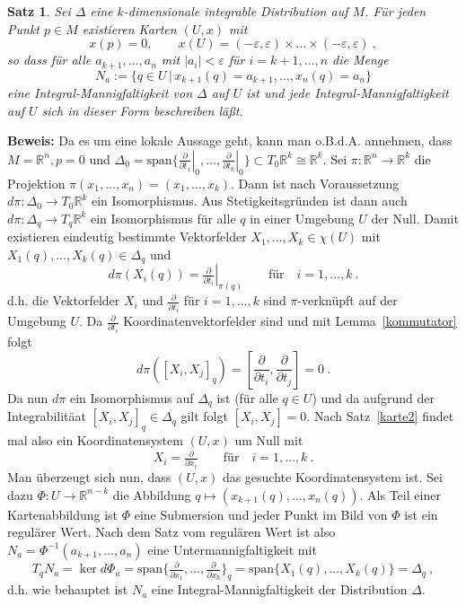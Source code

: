 \documentclass[12pt,a4paper]{article}
\def\R{\mathbb{R}}
\newtheorem{Satz}[Lemma]{Satz}
\def\proof{\noindent\textbf{Beweis:}\quad}
\begin{document}
\begin{Satz}
Sei $\Delta$ eine $k$-dimensionale integrable Distribution auf $M$. F\"ur jeden Punkt $p\in M$ existieren
Karten $(U,x)$ mit
$$
x(p) = 0, \qquad x(U) = (-\varepsilon, \varepsilon) \times \ldots \times  (-\varepsilon, \varepsilon) \ ,
$$
so dass f\"ur alle $a_{k+1}, \ldots, a_n$ mit $|a_i| < \varepsilon$ f\"ur $i=k+1,\ldots, n $ die Menge
$$
N_a := \{q\in U \,|\, x_{k+1}(q)= a_{k+1}, \ldots, x_n(q)=a_n\}
$$
eine Integral-Mannigfaltigkeit von $\Delta$ auf $U$ ist und jede Integral-Mannigfaltigkeit auf $U$ sich in
dieser Form beschreiben l\"a\ss t.
\end{Satz}
\proof
Da es um eine lokale Aussage geht, kann man o.B.d.A. annehmen, dass $M=\R^n, p=0$ und
$\Delta_0 = \mathrm{span} \{ \left.\tfrac{\partial }{\partial t_1}\right|_0, \ldots, \left.\tfrac{\partial }{\partial t_k}\right|_0\}
\subset T_0\R^k \cong \R^k$. Sei $\pi : \R^n \rightarrow \R^k$ die Projektion
$\pi(x_1,\ldots, x_n) = (x_1, \ldots, x_k)$. Dann ist nach Voraussetzung
$d\pi : \Delta_0 \rightarrow T_0\R^k$ ein Isomorphismus. Aus Stetigkeitsgr\"unden ist dann auch
$d\pi : \Delta_q \rightarrow T_q\R^k$ ein Isomorphismus f\"ur alle $q$ in einer Umgebung $U$ der Null. Damit
existieren eindeutig bestimmte Vektorfelder $X_1,\ldots, X_k \in \chi(U)$ mit
$X_1(q), \ldots, X_k(q) \in \Delta_q$ und
$$
d\pi (X_i(q)) = \left. \tfrac{\partial}{\partial t_i}\right|_{\pi(q)}
\qquad  \mbox{f\"ur} \quad i = 1, \ldots, k \ .
$$
d.h. die Vektorfelder $X_i$ und $\frac{\partial}{\partial t_i}$ f\"ur $i=1,\ldots, k$ sind
$\pi$-verkn\"upft auf der Umgebung $U$. Da $\frac{\partial}{\partial t_i}$ Koordinatenvektorfelder sind und
mit Lemma~\ref{kommutator} folgt
$$
d\pi ([X_i, X_j]_q) = [\frac{\partial}{\partial t_i}, \frac{\partial}{\partial t_j}] = 0 \ .
$$
Da nun $d\pi$ ein Isomorphismus auf $\Delta_q$ ist (f\"ur alle $q\in U$) und da aufgrund der
Integrabilit\"aat $[X_i, X_j]_q\in \Delta_q$ gilt folgt  $[X_i, X_j]=0$. Nach Satz~\ref{karte2}
findet mal also ein Koordinatensystem $(U,x)$ um Null mit
$$
X_i = \tfrac{\partial}{\partial x_i} \qquad \mbox{f\"ur}\quad  i = 1,\ldots,k \ .
$$
Man \"uberzeugt sich nun, dass $(U,x)$ das gesuchte Koordinatensystem ist. Sei dazu
$\Phi : U \rightarrow \R^{n-k}$ die Abbildung $q\mapsto
(x_{k+1}(q),\ldots,x_n(q))$. Als Teil einer Kartenabbildung ist $\Phi$ eine Submersion
und jeder Punkt im Bild von $\Phi$ ist ein regul\"arer Wert. Nach dem Satz vom
regul\"aren Wert ist also $N_a = \Phi^{-1}(a_{k+1}, \ldots, a_n)$ eine Untermannigfaltigkeit
mit
$$
T_q N_a = \ker d\Phi_a = \mathrm{span} \{ \tfrac{\partial}{\partial x_1},\ldots, \tfrac{\partial}{\partial x_k}\}_q
= \mathrm{span} \{ X_1(q),\ldots, X_k(q)\}
= \Delta_q \ ,
$$
d.h. wie behauptet ist $N_a$ eine Integral-Mannigfaltigkeit der Distribution $\Delta$.
\end{document}
